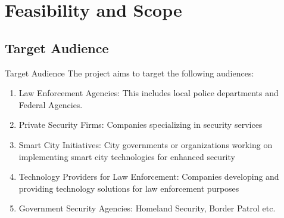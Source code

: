 \section{Feasibility and Scope}

\subsection{Target Audience}
\begin{frame}{Target Audience}
	The project aims to target the following audiences:
	\begin{enumerate}
		\item Law Enforcement Agencies: This includes local police departments and Federal Agencies.
		\item Private Security Firms: Companies specializing in security services
		\item Smart City Initiatives: City governments or organizations working on implementing smart city technologies for enhanced security
		\item Technology Providers for Law Enforcement: Companies developing and providing technology solutions for law enforcement purposes
		\item Government Security Agencies: Homeland Security, Border Patrol etc.
	\end{enumerate}
\end{frame}

